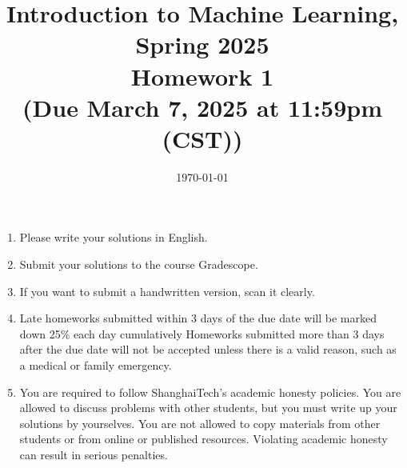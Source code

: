 \documentclass[10pt]{article}
\begin{document}
\date{\today}
\title{Introduction to Machine Learning, Spring 2025 \\
	Homework 1\\
	\small (Due March 7, 2025 at 11:59pm (CST))}
\maketitle

\begin{enumerate}
	\item Please write your solutions in English.
	\item Submit your solutions to the course Gradescope.
	\item If you want to submit a handwritten version, scan it clearly.
	\item Late homeworks submitted within 3 days of the due date will be marked down 25\% each day cumulatively Homeworks submitted more than 3 days after the due date will not be accepted unless there is a valid reason, such as a medical or family emergency.
	\item You are required to follow ShanghaiTech's academic honesty policies.  You are allowed to discuss problems with other students, but you must write up your solutions by yourselves.  You are not allowed to copy materials from other students or from online or published resources.  Violating academic honesty can result in serious penalties.
\end{enumerate}
\newpage


\begin{enumerate}





\end{enumerate}
\end{document}
